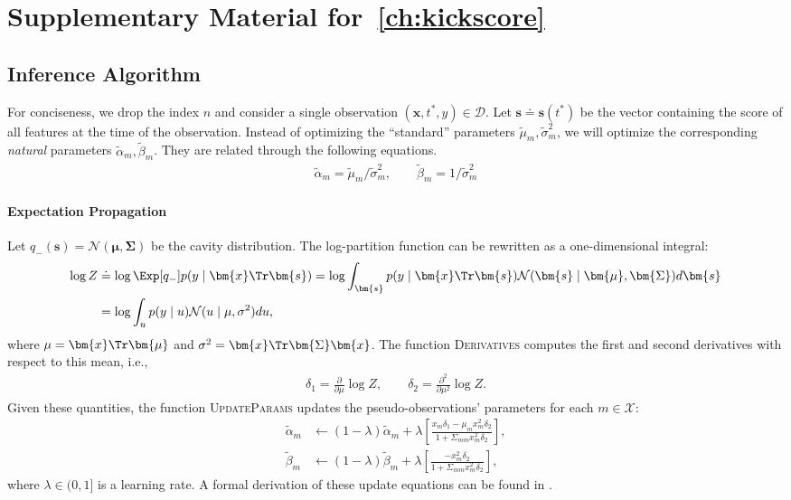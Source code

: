 \section{Supplementary Material for~\ref{ch:kickscore}}
\label{kks:app:suppmat}

\subsection{Inference Algorithm}
\label{kks:app:inference}

For conciseness, we drop the index $n$ and consider a single observation $(\bm{x}, t^*, y) \in \mathcal{D}$.
Let $\bm{s} \doteq \bm{s}(t^*)$ be the vector containing the score of all features at the time of the observation.
Instead of optimizing the ``standard'' parameters $\tilde{\mu}_m, \tilde{\sigma}^2_m$, we will optimize the corresponding \emph{natural} parameters $\tilde{\alpha}_m, \tilde{\beta}_m$.
They are related through the following equations.
\begin{align*}
	\tilde{\alpha}_m = \tilde{\mu}_m / \tilde{\sigma}^2_m, \qquad
	\tilde{\beta}_m = 1 / \tilde{\sigma}^2_m
\end{align*}

\paragraph{Expectation Propagation}

Let $q_{-}(\bm{s}) = \mathcal{N}(\bm{\mu}, \bm{\Sigma})$ be the cavity distribution.
The log-partition function can be rewritten as a one-dimensional integral:
\begin{align*}
	\log Z
	 & \doteq \log \Exp[q_{-}]{ p(y \mid \bm{x}\Tr \bm{s}) }
	= \log \int_{\bm{s}} p(y \mid \bm{x}\Tr \bm{s}) \mathcal{N}(\bm{s} \mid \bm{\mu}, \bm{\Sigma}) d\bm{s} \\
	 & = \log \int_{u} p(y \mid u) \mathcal{N}(u \mid \mu, \sigma^2) du,
\end{align*}
where $\mu = \bm{x}\Tr \bm{\mu}$ and $\sigma^2 = \bm{x}\Tr \bm{\Sigma} \bm{x}$.
The function \textsc{Derivatives} computes the first and second derivatives with respect to this mean, i.e.,
\begin{align*}
	\delta_1 = \frac{\partial}{\partial \mu} \log Z, \qquad
	\delta_2 = \frac{\partial^2}{\partial \mu^2} \log Z.
\end{align*}
Given these quantities, the function \textsc{UpdateParams} updates the pseudo-observations' parameters for each $m \in \mathcal{X}$:
\begin{align*}
	\tilde{\alpha}_m & \gets (1 - \lambda) \tilde{\alpha}_m
	+ \lambda \left[ \frac{x_m \delta_1 - \mu_m x_m^2 \delta_2}{1 + \Sigma_{mm} x_m^2 \delta_2} \right], \\
	\tilde{\beta}_m  & \gets (1 - \lambda) \tilde{\beta}_m
	+ \lambda \left[ \frac{-x_m^2 \delta_2}{1 + \Sigma_{mm} x_m^2 \delta_2} \right],
\end{align*}
where $\lambda \in (0, 1]$ is a learning rate.
A formal derivation of these update equations can be found in \citet{seeger2007bayesian, rasmussen2006gaussian, minka2001family}.

